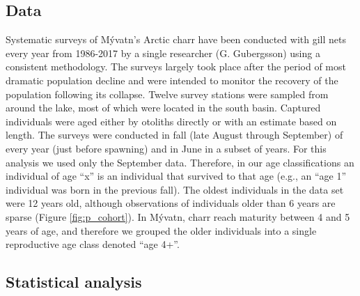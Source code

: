 \subsection*{Data} 

Systematic surveys of M\'{y}vatn’s Arctic charr have been conducted 
with gill nets every year from 1986-2017 by a single researcher (G. Gu{\dh}bergsson) 
using a consistent methodology. 
The surveys largely took place after the period of most dramatic population decline 
\citep{gudbergsson2004} 
and were intended to monitor the recovery of the population following its collapse. 
Twelve survey stations were sampled from around the lake,
most of which were located in the south basin. 
Captured individuals were aged either by otoliths directly or 
with an estimate based on length.
The surveys were conducted in fall (late August through September) 
of every year (just before spawning) and in June in a subset of years. 
For this analysis we used only the September data. 
Therefore, in our age classifications an individual of age ``x'' is an individual 
that survived to that age (e.g., an ``age 1'' individual was born in the previous fall). 
The oldest individuals in the data set were 12 years old, although observations 
of individuals older than 6 years are sparse
(Figure \ref{fig:p_cohort}). 
In M\'{y}vatn, charr reach maturity between 4 and 5 years of age, 
and therefore we grouped the older individuals into a single reproductive age class
denoted ``age 4+''.

\subsection*{Statistical analysis} 

